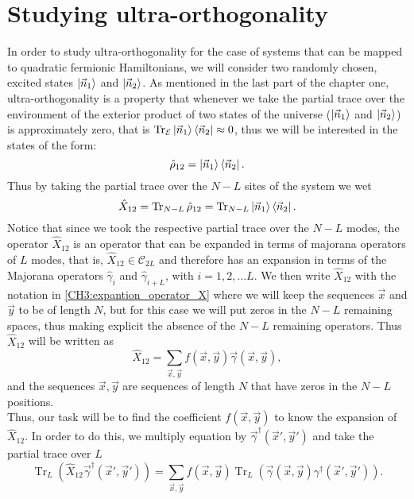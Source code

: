\section{Studying ultra-orthogonality}
In order to study ultra-orthogonality for the case of systems that can be mapped to quadratic fermionic Hamiltonians, we will consider two randomly chosen, excited states $\mathinner{|{\vec{n}_1}\rangle}$ and $\mathinner{|{\vec{n}_2}\rangle}$. As mentioned in the last part of the chapter one, ultra-orthogonality is a property that whenever we take the partial trace over the environment of the exterior product of two states of the universe ($\mathinner{|{\vec{n}_1}\rangle}$ and $\mathinner{|{\vec{n}_2}\rangle}$) is approximately zero, that is $\operatorname{Tr}_{\mathcal{E}}\mathinner{|{\vec{n}_1}\rangle}\mathinner{\langle{\vec{n}_2}|}\approx 0$, thus we will be interested in the states of the form: 
\begin{equation}
\hat{\rho}_{12} = \mathinner{|{\vec{n}_1}\rangle}\mathinner{\langle{\vec{n}_2}|}.
\end{equation}
Thus by taking the partial trace over the $N-L$ sites of the system we wet
\begin{equation}
\hat{X}_{12} = \operatorname{Tr}_{N-L} \hat{\rho}_{12} = \operatorname{Tr}_{N-L} \mathinner{|{\vec{n}_1}\rangle}\mathinner{\langle{\vec{n}_2}|}.
\end{equation}
Notice that since we took the respective partial trace over the $N-L$ modes, the operator $\hat{X}_{12}$  is an operator that can be expanded in terms of majorana operators of $L$ modes, that is, $\hat{X}_{12}\in \mathcal{C}_{2L}$ and therefore has an expansion in terms of the Majorana operators $\hat{\gamma}_i$ and $\hat{\gamma}_{i+L}$, with $i=1,2,\ldots L$. We then write $\hat{X}_{12}$ with the notation in \eqref{CH3:expantion_operator_X} where we will keep the sequences $\vec{x}$ and $\vec{y}$ to be of length $N$, but for this case we will put zeros in the $N-L$ remaining spaces, thus making explicit the absence of the $N-L$ remaining operators. Thus $\hat{X}_{12}$ will be written as
\begin{equation}
\hat{X}_{12} = \sum_{\vec{x},\vec{y}} f(\vec{x},\vec{y})\vec{\gamma}(\vec{x},\vec{y}),
\label{CH3:x_1_2_state}
\end{equation}
and the sequences $\vec{x},\vec{y}$ are sequences of length $N$ that have zeros in the $N-L$ positions.\\
\indent Thus, our task will be to find the coefficient $f(\vec{x},\vec{y})$ to know the expansion of $\hat{X}_{12}$. In order to do this, we multiply equation  by $\vec{\gamma}^{\dagger}(\vec{x}',\vec{y}')$ and take the partial trace over $L$
\begin{equation}
\operatorname{Tr}_L\left(\hat{X}_{12}\vec{\gamma}^{\dagger}(\vec{x}',\vec{y}')\right)=\sum_{\vec{x},\vec{y}}f(\vec{x},\vec{y}) \operatorname{Tr}_L\left(\vec{\gamma}(\vec{x},\vec{y})\gamma^{\dagger}(\vec{x}',\vec{y}')\right).
\label{CH3:partial_trace_1}
\end{equation}
